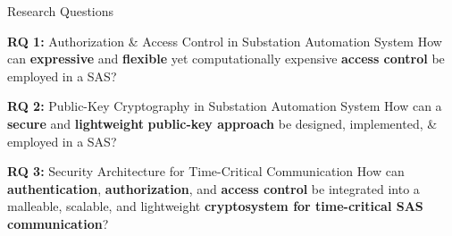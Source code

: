 \documentclass[en]{sdqbeamer}
\begin{document}
\begin{frame}{Research Questions}
    \begin{greenblock}{\textbf{RQ 1:} Authorization \& Access Control in Substation Automation System}
        How can \textbf{expressive} and \textbf{flexible} yet computationally expensive \textbf{access control} be employed in a SAS?
    \end{greenblock}

    \begin{greenblock}{\textbf{RQ 2:} Public-Key Cryptography in Substation Automation System}
        How can a \textbf{secure} and \textbf{lightweight} \textbf{public-key approach} be designed, implemented, \& employed in a SAS?
    \end{greenblock}

    \begin{greenblock}{\textbf{RQ 3:} Security Architecture for Time-Critical Communication}
        How can \textbf{authentication}, \textbf{authorization}, and \textbf{access control} be integrated into a malleable, scalable, and lightweight \textbf{cryptosystem for time-critical SAS communication}?
    \end{greenblock}
\end{frame}
\end{document}
